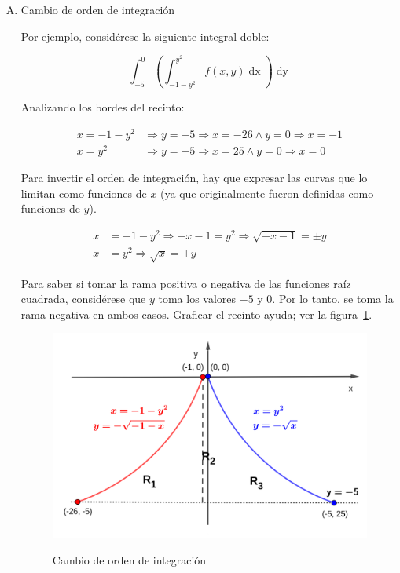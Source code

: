 \documentclass{article}
\begin{document}
\begin{enumerate}[(A)]
\item Cambio de orden de integración

Por ejemplo, considérese la siguiente integral doble:

\begin{equation}
\int_{-5}^0 \left( \int_{-1-y^2}^{y^2} f(x,y) \mathop{dx} \right) \mathop{dy}
\end{equation}

Analizando los bordes del recinto:

\begin{align}
x = -1-y^2 &\Rightarrow y = -5 \Rightarrow x = -26 \wedge y = 0 \Rightarrow x = -1 \\
x = y^2 &\Rightarrow y = -5 \Rightarrow x =25 \wedge y = 0 \Rightarrow x = 0
\end{align}

Para invertir el orden de integración, hay que expresar las curvas que lo limitan como funciones de $x$ (ya que originalmente fueron definidas como funciones de $y$).

\begin{align}
x &= -1-y^2 \Rightarrow -x - 1 = y^2 \Rightarrow \sqrt{-x-1} = \pm y \\
x &= y^2 \Rightarrow \sqrt{x} = \pm y
\end{align}

Para saber si tomar la rama positiva o negativa de las funciones raíz cuadrada, considérese que $y$ toma los valores $-5$ y $0$. Por lo tanto, se toma la rama negativa en ambos casos. Graficar el recinto ayuda; ver la figura~\ref{fig:coi}.

\begin{figure}[ht]
\centering
\caption{Cambio de orden de integración}
\includegraphics[scale=0.75]{img/teo_fig027_coi.png}
\label{fig:coi}
\end{figure}


\end{enumerate}
\end{document}
